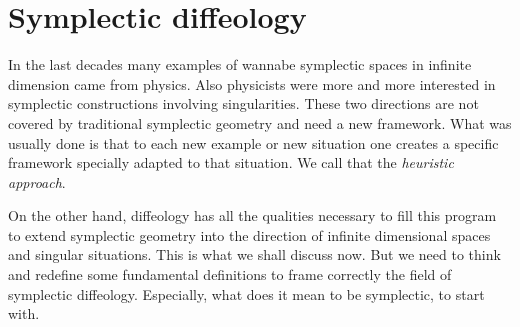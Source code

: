 \section{Symplectic diffeology}
\label{Symplectic diffeology}

In the last decades many examples of wannabe symplectic spaces in infinite dimension came from physics.
Also physicists were more and more interested in symplectic constructions involving singularities.
These two directions are not covered by traditional symplectic geometry and need a new framework.
What was usually done is that to each new example or new situation one creates a specific framework specially adapted to that situation.
We call that the \emph{heuristic approach}.

On the other hand,
diffeology has all the qualities necessary to fill this program to extend symplectic geometry into the direction of infinite dimensional spaces and singular situations.
This is what we shall discuss now.
But we need to think and redefine some fundamental definitions to frame correctly the field of symplectic diffeology.
Especially,
what does it mean to be symplectic,
to start with.

